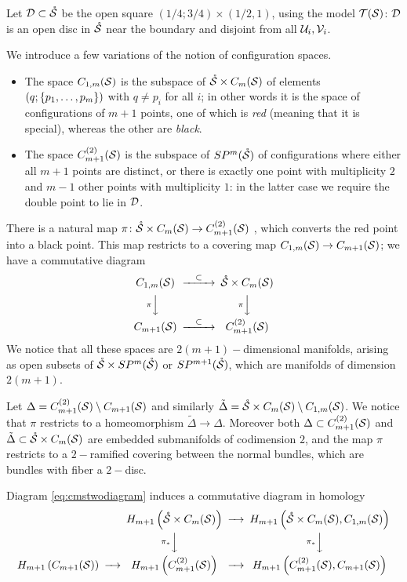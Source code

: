 \begin{defn}\label{defn:variationsCm}
Let $\D\subset\mrS$ be the open square $(1/4;3/4)\times(1/2,1)$, using the model $\T(\S)$:
$\D$ is an open disc in $\mrS$ near the boundary and disjoint from all $\U_i,\V_i$.

We introduce a few variations of the notion of configuration spaces.
\begin{itemize} 
 \item The space $C_{1,m}(\S)$ is the subspace of $\mrS\times \cms$ of elements
 $(q;\set{p_1,\dots,p_m})$ with $q\neq p_i$ for all $i$; in other words it is
 the space of configurations of $m+1$ points, one of which is \emph{red} (meaning that
 it is special), whereas the other are \emph{black}.
 \item The space $\cmstwo$ is the subspace of $\SP^m(\mrS)$ of configurations where either all $m+1$ points
 are distinct, or there is exactly one point with multiplicity $2$ and $m-1$ other points with multiplicity $1$:
 in the latter case we require the double point to lie in $\D$.
\end{itemize}
There is a natural map $\pi\colon\mrS\times \cms\to \cmstwo$ , which converts the red point
into a black point. This map restricts to a covering map $C_{1,m}(\S)\to C_{m+1}(\S)$; we have a commutative
 diagram
 \begin{equation}\label{eq:cmstwodiagram}
  \begin{CD}
   C_{1,m}(\S) @>\subset >> \mrS\times \cms \\
   @V\pi VV @V\pi VV\\
   C_{m+1}(\S) @>\subset >> \cmstwo
   \end{CD}
\end{equation}
We notice that all these spaces are $2(m+1)-$dimensional manifolds, arising as open subsets
of $\mrS\times\SP^m(\mrS)$ or $\SP^{m+1}(\mrS)$, which are manifolds of dimension $2(m+1)$.

Let $\Delta=\cmstwo\setminus C_{m+1}(\S)$ and similarly $\tilde\Delta=\mrS\times \cms\setminus C_{1,m}(\S)$.
We notice that $\pi$ restricts to a homeomorphism $\tilde\Delta\to\Delta$. Moreover both $\Delta\subset\cmstwo$
and $\tilde\Delta\subset\mrS\times \cms$ are embedded submanifolds of codimension $2$, and the map $\pi$ restricts to
a $2-$ramified covering between the normal bundles, which are bundles with fiber a $2-$disc.
\end{defn}

Diagram \ref{eq:cmstwodiagram} induces a commutative diagram in homology
\[
\minCDarrowwidth15pt
 \begin{CD}
  @. H_{m+1}\pa{\mrS\times \cms} @>>> H_{m+1}\pa{\mrS\times \cms, C_{1,m}(\S)}\\
  @. @V\pi_*VV @V\pi_*VV\\
  H_{m+1}\pa{ C_{m+1}(\S)} @>>> H_{m+1}\pa{\cmstwo} @>>> H_{m+1}\pa{\cmstwo,C_{m+1}(\S)}
 \end{CD}
\]

